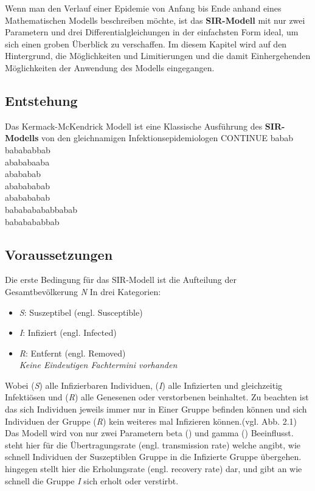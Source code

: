 \documentclass[12pt]{scrartcl} %
\begin{document}
Wenn man den Verlauf einer Epidemie von Anfang bis Ende anhand eines Mathematischen Modells beschreiben möchte, ist das \textbf{SIR-Modell} 
mit nur zwei Parametern und drei Differentialgleichungen in der einfachsten Form ideal, um sich einen groben Überblick zu verschaffen. \cite[vgl.]{4}
Im diesem Kapitel wird auf den Hintergrund, die Möglichkeiten und Limitierungen und die damit Einhergehenden Möglichkeiten der Anwendung des Modells eingegangen.

\subsection{Entstehung}

Das Kermack-McKendrick Modell ist eine Klassische Ausführung des \textbf{SIR-Modells} von den gleichnamigen Infektionsepidemiologen CONTINUE
babab\\
babababbab\\
abababaaba\\
abababab\\
ababababab\\
ababababab\\
babababababbabab\\
bababababbab\\


\subsection{Voraussetzungen}

Die erste Bedingung für das SIR-Modell ist die Aufteilung der Gesamtbevölkerung \textit{N} In drei Kategorien:

\begin{itemize}
	\item \textit{S}: Suszeptibel (engl. Susceptible)
	\item \textit{I}: Infiziert (engl. Infected)
	\item \textit{R}: Entfernt (engl. Removed)\\
	\small \textsl{Keine Eindeutigen Fachtermini vorhanden}
\end{itemize}
\normalsize

Wobei (\textit{S}) alle Infizierbaren Individuen, (\textit{I}) alle Infizierten und gleichzeitig Infektiösen und (\textit{R}) alle Genesenen oder verstorbenen beinhaltet.  Zu beachten ist das sich Individuen jeweils immer nur in Einer Gruppe befinden können und sich Individuen der Gruppe 
(\textit{R}) kein weiteres mal Infizieren können.(vgl. Abb. 2.1) %
Das Modell wird von nur zwei Parametern beta (\textbeta) und gamma (\textgamma) Beeinflusst. 
\textbeta \space steht hier für die Übertragungsrate (engl. transmission rate) welche angibt, wie schnell Individuen der Suszeptiblen Gruppe in die Infizierte Gruppe übergehen. 
\textgamma \space hingegen stellt hier die Erholungsrate (engl. recovery rate) dar, und gibt an wie schnell die Gruppe \textit{I} sich erholt oder verstirbt.
\end{document}
